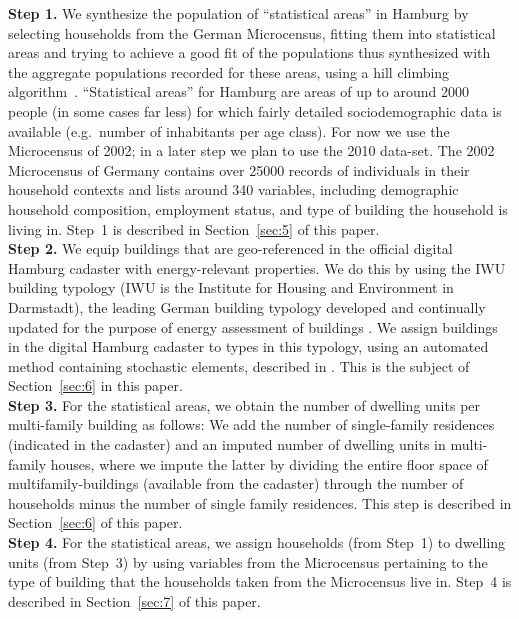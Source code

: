 \documentclass[11pt]{IJM-article}
\begin{document}
\textbf{Step 1.} We synthesize the population of ``statistical areas'' in
Hamburg by selecting households from the German Microcensus, fitting them into
statistical areas and trying to achieve a good fit of the populations thus
synthesized with the aggregate populations recorded for these areas, using a
hill climbing algorithm~\cite{Williamson.1998}. ``Statistical areas'' for
Hamburg are areas of up to around 2000 people (in some cases far less) for
which fairly detailed sociodemographic data is available (e.g.\ number of
inhabitants per age class). For now we use the Microcensus of 2002; in a later
step we plan to use the 2010 data-set. The 2002 Microcensus of Germany contains
over 25000 records of individuals in their household contexts and lists around
340 variables, including demographic household composition, employment status,
and type of building the household is living in. Step~1 is described in
Section~\ref{sec:5} of this paper.\\

\textbf{Step 2.} We equip buildings that are geo-referenced in the official
digital Hamburg cadaster with energy-relevant properties. We do this by using
the IWU building typology (IWU is the Institute for Housing and Environment in
Darmstadt), the leading German building typology developed and continually
updated for the purpose of energy assessment of buildings . We
assign buildings in the digital Hamburg cadaster to types in this typology,
using an automated method containing stochastic elements, described in
. This is the subject of Section~\ref{sec:6} in this
paper.\\

\textbf{Step 3.} For the statistical areas, we obtain the number of dwelling
units per multi-family building as follows: We add the number of single-family
residences (indicated in the cadaster) and an imputed number of dwelling units
in multi-family houses, where we impute the latter by dividing the entire floor
space of multifamily-buildings (available from the cadaster) through the number
of households minus the number of single family residences. This step is
described in Section~\ref{sec:6} of this paper.\\

\textbf{Step 4.} For the statistical areas, we assign households (from Step~1)
to dwelling units (from Step~3) by using variables from the Microcensus
pertaining to the type of building that the households taken from the
Microcensus live in. Step~4 is described in Section~\ref{sec:7} of this
paper.\\
\end{document}
